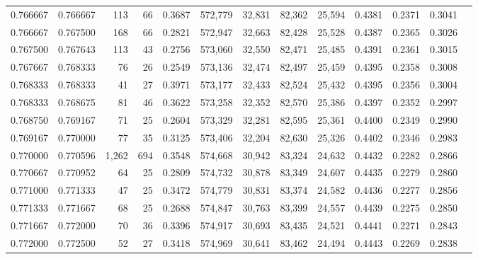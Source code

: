 \begin{tabular}{rrrrrrrrrrrrr}
0.766667 & 0.766667 &   113 &  66 &                                     0.3687 & 572,779 &  32,831 &  82,362 &  25,594 & 0.4381 & 0.2371 & 0.3041 \\
0.766667 & 0.767500 &   168 &  66 &                                     0.2821 & 572,947 &  32,663 &  82,428 &  25,528 & 0.4387 & 0.2365 & 0.3026 \\
0.767500 & 0.767643 &   113 &  43 &                                     0.2756 & 573,060 &  32,550 &  82,471 &  25,485 & 0.4391 & 0.2361 & 0.3015 \\
0.767667 & 0.768333 &    76 &  26 &                                     0.2549 & 573,136 &  32,474 &  82,497 &  25,459 & 0.4395 & 0.2358 & 0.3008 \\
0.768333 & 0.768333 &    41 &  27 &                                     0.3971 & 573,177 &  32,433 &  82,524 &  25,432 & 0.4395 & 0.2356 & 0.3004 \\
0.768333 & 0.768675 &    81 &  46 &                                     0.3622 & 573,258 &  32,352 &  82,570 &  25,386 & 0.4397 & 0.2352 & 0.2997 \\
0.768750 & 0.769167 &    71 &  25 &                                     0.2604 & 573,329 &  32,281 &  82,595 &  25,361 & 0.4400 & 0.2349 & 0.2990 \\
0.769167 & 0.770000 &    77 &  35 &                                     0.3125 & 573,406 &  32,204 &  82,630 &  25,326 & 0.4402 & 0.2346 & 0.2983 \\
0.770000 & 0.770596 & 1,262 & 694 &                                     0.3548 & 574,668 &  30,942 &  83,324 &  24,632 & 0.4432 & 0.2282 & 0.2866 \\
0.770667 & 0.770952 &    64 &  25 &                                     0.2809 & 574,732 &  30,878 &  83,349 &  24,607 & 0.4435 & 0.2279 & 0.2860 \\
0.771000 & 0.771333 &    47 &  25 &                                     0.3472 & 574,779 &  30,831 &  83,374 &  24,582 & 0.4436 & 0.2277 & 0.2856 \\
0.771333 & 0.771667 &    68 &  25 &                                     0.2688 & 574,847 &  30,763 &  83,399 &  24,557 & 0.4439 & 0.2275 & 0.2850 \\
0.771667 & 0.772000 &    70 &  36 &                                     0.3396 & 574,917 &  30,693 &  83,435 &  24,521 & 0.4441 & 0.2271 & 0.2843 \\
0.772000 & 0.772500 &    52 &  27 &                                     0.3418 & 574,969 &  30,641 &  83,462 &  24,494 & 0.4443 & 0.2269 & 0.2838 \\

\end{tabular}
